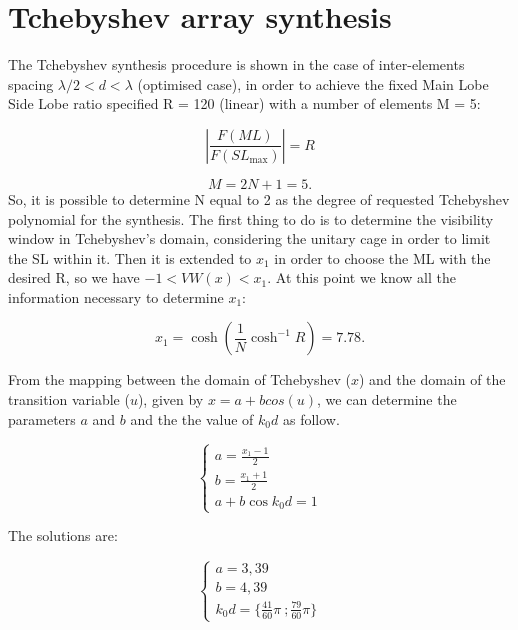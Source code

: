 \documentclass[11pt]{report}
\begin{document}
\setcounter{page}{0}
\chapter{Tchebyshev array synthesis}
The Tchebyshev synthesis procedure is shown in the case of inter-elements spacing $ \lambda/2<d<\lambda $ (optimised case), in order to achieve the fixed Main Lobe Side Lobe ratio specified R = 120 (linear) with a number of elements M = 5:

\begin{equation}
\left|\frac{F(M L)}{F\left(S L_{\max }\right)}\right|=R
\end{equation}

\begin{equation}
M = 2N + 1 = 5.
\end{equation}
So, it is possible to determine N equal to 2 as the degree of requested Tchebyshev polynomial for the synthesis. The first thing to do is to determine the visibility window in Tchebyshev's domain, considering the unitary cage in order to limit the SL within it. Then it is extended to  $x_{1}$ in order to choose the ML with the desired R, so we have $ -1<VW(x)<x_{1} $. \newline
At this point we know all the information necessary to determine $x_{1}$:

\begin{equation}
x_{1}=\cosh \left(\frac{1}{N} \cosh ^{-1} R\right)=7.78.
\end{equation}

From the mapping between the domain of Tchebyshev ($x$) and the domain of the transition variable ($u$), given by $ x = a + b cos(u) $, we can determine the parameters $a$ and $b$ and the the value of $k_{0}d$ as follow.

\begin{equation}
\left\{\begin{array}{l}
a=\frac{x_{1}-1}{2} \\
b=\frac{x_{1}+1}{2}\\
a + b\cos{k_{0}d} = 1
\end{array}\right.
\end{equation} 

The solutions are:

\begin{equation}
\left\{\begin{array}{l}
a=3,39 \\
b=4,39\\
k_{0}d = \{ \frac{41}{60}\pi \ ; \frac{79}{60}\pi\}
\end{array}\right.
\end{equation} 
\end{document}
